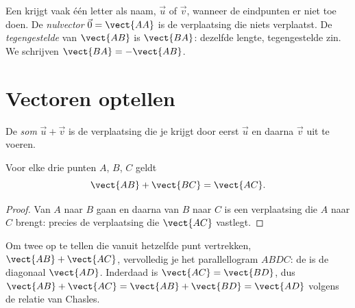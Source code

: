 \begin{notation}
Een  krijgt vaak één letter als naam, $\vec u$ of $\vec v$, wanneer de
eindpunten er niet toe doen. De \emph{nulvector} $\vec 0 = \vect{AA}$ is de
verplaatsing die niets verplaatst. De \emph{tegengestelde} van $\vect{AB}$ is
$\vect{BA}$: dezelfde lengte, tegengestelde zin. We schrijven
$\vect{BA} = -\vect{AB}$.
\end{notation}

\section{Vectoren optellen}

\begin{definition}\label{def:g10:vectors:sum}
De \emph{som} $\vec u + \vec v$ is de verplaatsing die je
krijgt door eerst $\vec u$ en daarna $\vec v$ uit te voeren.
\end{definition}

\begin{theorem}\label{thm:g10:vectors:chasles}
Voor elke drie punten $A$, $B$, $C$ geldt
\[
\vect{AB} + \vect{BC} = \vect{AC}.
\]
\end{theorem}

\begin{proof}
Van $A$ naar $B$ gaan en daarna van $B$ naar $C$ is een verplaatsing die $A$
naar $C$ brengt: precies de verplaatsing die $\vect{AC}$ vastlegt.
\end{proof}

\begin{remark}[Parallellogramregel]
Om twee  op te tellen die vanuit hetzelfde punt vertrekken,
$\vect{AB} + \vect{AC}$, vervolledig je het parallellogram $ABDC$: de  is
de diagonaal $\vect{AD}$. Inderdaad is $\vect{AC} = \vect{BD}$, dus
$\vect{AB} + \vect{AC} = \vect{AB} + \vect{BD} = \vect{AD}$ volgens de
relatie van Chasles.
\end{remark}

